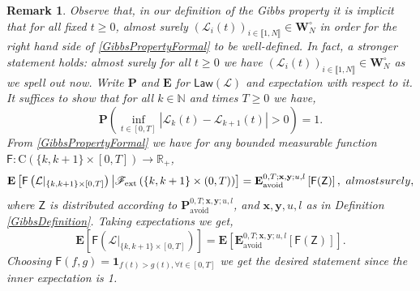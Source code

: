 \documentclass[10pt,a4paper]{amsart}
\newtheorem{rmk}{Remark}
\begin{document}
\begin{rmk}\label{RmkNonIntersectionGibbs}
Observe that, in our definition of the Gibbs property it is implicit that for all fixed $t\ge 0$, almost surely $(\mathcal{L}_i(t))_{i\in \llbracket 1,N \rrbracket }\in \mathbf{W}_N^\circ$ in order for the right hand side of \eqref{GibbsPropertyFormal} to be well-defined. In fact, a stronger statement holds: almost surely for all $t\ge 0$ we have $(\mathcal{L}_i(t))_{i\in \llbracket 1,N \rrbracket }\in \mathbf{W}_N^\circ$ as we spell out now. Write $\mathbf{P}$ and $\mathbf{E}$ for $\mathsf{Law}(\mathcal{L})$ and expectation with respect to it. It suffices to show that for all $k \in \mathbb{N}$ and times $T\ge 0$ we have,
\begin{equation*}
\mathbf{P}\left(\inf_{t\in [0,T]}\left|\mathcal{L}_k(t)-\mathcal{L}_{k+1}(t)\right|>0\right)=1.
\end{equation*}
From \eqref{GibbsPropertyFormal} we have for any bounded measurable function $\mathsf{F}:\mathrm{C}(\{k,k+1\}\times[0,T])\to \mathbb{R}_+$,
\begin{equation*}
\mathbf{E}\left[\mathsf{F}\left(\mathcal{L}|_{\{k,k+1\}\times[0,T]}\right)\big|\mathscr{F}_{\mathrm{ext}}\left(\{k,k+1\} \times (0,T) \right)\right]=\mathbf{E}_{\mathrm{avoid}}^{0,T;\mathbf{x},\mathbf{y};u,l}\left[\mathsf{F}(\mathsf{Z})\right], \ \textnormal{ almost surely},
\end{equation*}
where $\mathsf{Z}$ is distributed according to $\mathbf{P}_{\mathrm{avoid}}^{0,T;\mathbf{x},\mathbf{y};u,l}$, and $\mathbf{x},\mathbf{y},u,l$ as in Definition \ref{GibbsDefinition}. Taking expectations we get,
\begin{equation*}
\mathbf{E}\left[\mathsf{F}\left(\mathcal{L}|_{\{k,k+1\}\times[0,T]}\right)\right]=\mathbf{E}\left[\mathbf{E}_{\mathrm{avoid}}^{0,T;\mathbf{x},\mathbf{y};u,l}\left[\mathsf{F}(\mathsf{Z})\right]\right].
\end{equation*}
 Choosing $\mathsf{F}(f,g)=\mathbf{1}_{f(t)>g(t), \forall t \in [0,T]}$ we get the desired statement since the inner expectation is 1.
\end{rmk}
\end{document}
